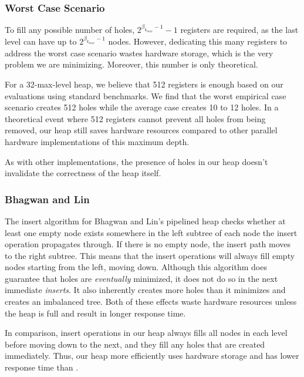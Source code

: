 \subsubsection{Worst Case Scenario}
To fill any possible number of holes, $2^{\beta_{k_{max}}-1} - 1$ registers are required, as the last level can have up to $2^{\beta_{k_{max}}-1}$ nodes. 
However, dedicating this many registers to address the worst case scenario wastes hardware storage, which is the very problem we are minimizing. 
Moreover, this number is only theoretical.

For a 32-max-level heap, we believe that 512 registers is enough based on our evaluations using standard benchmarks.
We find that the worst empirical case scenario creates 512 holes while the average case creates 10 to 12 holes.
In a theoretical event where 512 registers cannot prevent all holes from being removed, our heap still saves hardware resources compared to other parallel hardware implementations of this maximum depth. 

As with other implementations, the presence of holes in our heap doesn't invalidate the correctness of the heap itself.

\subsubsection{Bhagwan and Lin}
The insert algorithm for Bhagwan and Lin's pipelined heap \cite{hw2} checks whether at least one empty node exists somewhere in the left subtree of each node the insert operation propagates through. 
If there is no empty node, the insert path moves to the right subtree. 
This means that the insert operations will always fill empty nodes starting from the left, moving down. 
Although this algorithm does guarantee that holes are {\it eventually} minimized, it does not do so in the next immediate {\it inserts}. 
It also inherently creates more holes than it minimizes and creates an imbalanced tree. 
Both of these effects waste hardware resources unless the heap is full and result in longer response time.

In comparison, insert operations in our heap always fills all nodes in each level before moving down to the next, and they fill any holes that are created immediately. Thus, our heap more efficiently uses hardware storage and has lower response time than \cite{hw2}.